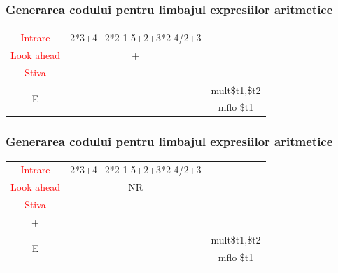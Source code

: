\documentclass[pdf]{beamer}
\begin{document}
\begin{frame}
\frametitle{Generarea codului pentru limbajul expresiilor aritmetice}
\begin{center}
\begin{tabular}{cc|c|} \cline{1-2}
\multicolumn{1}{|c|}{\textcolor{red}{Intrare}} & {2*3+4+2*2-1-5+2+3*2-4/2+3} \\ \cline{1-2}
\multicolumn{1}{|c|}{\textcolor{red}{Look ahead}} & + \\ \cline{1-2}
\multicolumn{1}{|c|}{\textcolor{red}{Stiva}}  \\
\cline{1-1} \cline{3-3}
\multicolumn{1}{|c|}{\multirow{2}{*}{E}} & & {mult\quad \$t1,\$t2 }\\
\multicolumn{1}{|c|}{} & & {mflo \quad \$t1} \\
\cline{1-1} \cline{3-3} 
\end{tabular}
\end{center}
\end{frame}



\begin{frame}
\frametitle{Generarea codului pentru limbajul expresiilor aritmetice}
\begin{center}
\begin{tabular}{cc|c|} \cline{1-2}
\multicolumn{1}{|c|}{\textcolor{red}{Intrare}} & {2*3+4+2*2-1-5+2+3*2-4/2+3} \\ \cline{1-2}
\multicolumn{1}{|c|}{\textcolor{red}{Look ahead}} & NR \\ \cline{1-2}
\multicolumn{1}{|c|}{\textcolor{red}{Stiva}}  \\
\cline{1-1} \cline{3-3}
\multicolumn{1}{|c|}{+} & & {}\\
\cline{1-1} \cline{3-3}
\multicolumn{1}{|c|}{\multirow{2}{*}{E}} & & { mult\quad \$t1,\$t2 }\\
\multicolumn{1}{|c|}{} & & { mflo \quad \$t1} \\
\cline{1-1} \cline{3-3} 
\end{tabular}
\end{center}
\end{frame}
\end{document}
